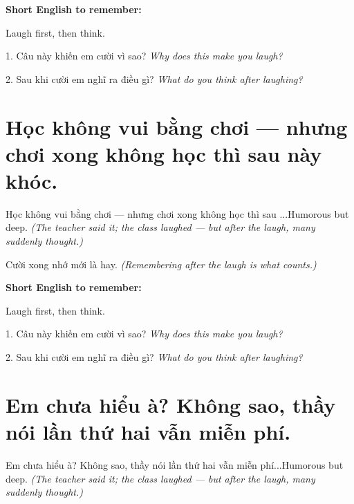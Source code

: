 \begin{ghinhoanh}
\textbf{Short English to remember:}

Laugh first, then think.

\end{ghinhoanh}

\begin{tuhocnhanh}
1. Câu này khiến em cười vì sao? \textit{Why does this make you laugh?}

2. Sau khi cười em nghĩ ra điều gì? \textit{What do you think after laughing?}
\end{tuhocnhanh}
\ngancach


\section{Học không vui bằng chơi — nhưng chơi xong không học thì sau này khóc.}
\begin{truyen}{Học không vui bằng chơi — nhưng chơi xong không học thì sau ...}{Humorous but deep.}
\textit{(The teacher said it; the class laughed — but after the laugh, many suddenly thought.)}
\end{truyen}

\begin{baihoc}
Cười xong nhớ mới là hay.
\textit{(Remembering after the laugh is what counts.)}
\end{baihoc}

\begin{ghinhoanh}
\textbf{Short English to remember:}

Laugh first, then think.

\end{ghinhoanh}

\begin{tuhocnhanh}
1. Câu này khiến em cười vì sao? \textit{Why does this make you laugh?}

2. Sau khi cười em nghĩ ra điều gì? \textit{What do you think after laughing?}
\end{tuhocnhanh}
\ngancach


\section{Em chưa hiểu à? Không sao, thầy nói lần thứ hai vẫn miễn phí.}
\begin{truyen}{Em chưa hiểu à? Không sao, thầy nói lần thứ hai vẫn miễn phí...}{Humorous but deep.}
\textit{(The teacher said it; the class laughed — but after the laugh, many suddenly thought.)}
\end{truyen}

